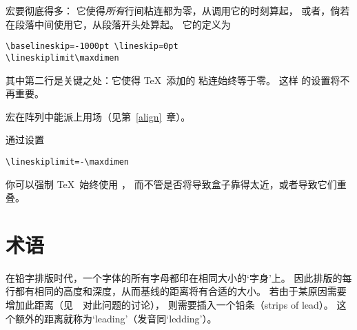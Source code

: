 \documentclass{book}
\begin{document}
 宏要彻底得多：
它使得{\sl 所有\/}行间粘连都为零，从调用它的时刻算起，
或者，倘若在段落中间使用它，从段落开头处算起。
它的定义为
\begin{verbatim}
\baselineskip=-1000pt \lineskip=0pt 
\lineskiplimit\maxdimen
\end{verbatim}
其中第二行是关键之处：它使得 \TeX\ 添加的  粘连始终等于零。
这样  的设置将不再重要。

 宏在阵列中能派上用场（见第~\ref{align}~章）。

通过设置
\begin{verbatim}
\lineskiplimit=-\maxdimen
\end{verbatim}
你可以强制 \TeX\ 始终使用 ，
而不管是否将导致盒子靠得太近，或者导致它们重叠。


\section{术语}

在铅字排版时代，一个字体的所有字母都印在相同大小的`字身'上。
因此排版的每行都有相同的高度和深度，从而基线的距离将有合适的大小。
若由于某原因需要增加此距离（见~\cite{White:line}~对此问题的讨论），
则需要插入一个铅条（strips of lead）。
这个额外的距离就称为`leading'（发音同`ledding'）。
\end{document}

